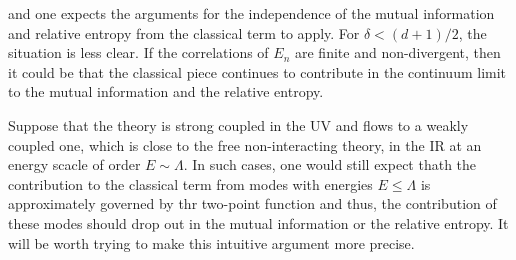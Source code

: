 and one expects the arguments for the independence of the mutual information
and relative entropy from the classical term to apply. For $\delta < (d+1)/2$,
the situation is less clear. If the correlations of $E_n$ are finite and
non-divergent, then it could be that the classical piece continues to
contribute in the continuum limit to the mutual information and the relative
entropy.
\par Suppose that the theory is strong coupled in the UV and flows to a weakly
coupled one, which is close to the free non-interacting theory, in the IR at an
energy scacle of order $E\sim \Lambda$. In such cases, one would still expect
thath the contribution to the classical term from modes with energies
$E\leq\Lambda$ is approximately governed by thr two-point function and thus,
the contribution of these modes should drop out in the mutual information or
the relative entropy. It will be worth trying to make this intuitive argument
more precise.

